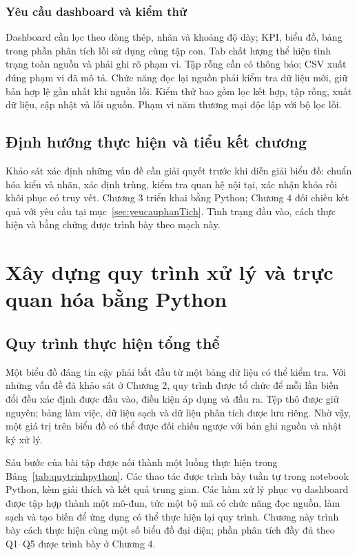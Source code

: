 \documentclass[12pt,a4paper,oneside]{report}
\begin{document}
\subsection{Yêu cầu dashboard và kiểm thử}

Dashboard cần lọc theo dòng thép, nhãn và khoảng độ dày; KPI, biểu đồ, bảng trong phần phân tích lỗi sử dụng cùng tập con. Tab chất lượng thể hiện tình trạng toàn nguồn và phải ghi rõ phạm vi. Tập rỗng cần có thông báo; CSV xuất đúng phạm vi đã mô tả. Chức năng đọc lại nguồn phải kiểm tra dữ liệu mới, giữ bản hợp lệ gần nhất khi nguồn lỗi. Kiểm thử bao gồm lọc kết hợp, tập rỗng, xuất dữ liệu, cập nhật và lỗi nguồn. Phạm vi năm thương mại độc lập với bộ lọc lỗi.

\section{Định hướng thực hiện và tiểu kết chương}

Khảo sát xác định những vấn đề cần giải quyết trước khi diễn giải biểu đồ: chuẩn hóa kiểu và nhãn, xác định trùng, kiểm tra quan hệ nội tại, xác nhận khóa rồi khôi phục có truy vết. Chương 3 triển khai bằng Python; Chương 4 đối chiếu kết quả với yêu cầu tại mục~\ref{sec:yeucauphanTich}. Tình trạng đầu vào, cách thực hiện và bằng chứng được trình bày theo mạch này.

\chapter{Xây dựng quy trình xử lý và trực quan hóa bằng Python}
\label{chap:thuchien}

\section{Quy trình thực hiện tổng thể}

Một biểu đồ đáng tin cậy phải bắt đầu từ một bảng dữ liệu có thể kiểm tra. Với những vấn đề đã khảo sát ở Chương 2, quy trình được tổ chức để mỗi lần biến đổi đều xác định được đầu vào, điều kiện áp dụng và đầu ra. Tệp thô được giữ nguyên; bảng làm việc, dữ liệu sạch và dữ liệu phân tích được lưu riêng. Nhờ vậy, một giá trị trên biểu đồ có thể được đối chiếu ngược với bản ghi nguồn và nhật ký xử lý.

Sáu bước của bài tập được nối thành một luồng thực hiện trong Bảng~\ref{tab:quytrinhpython}. Các thao tác được trình bày tuần tự trong notebook Python, kèm giải thích và kết quả trung gian. Các hàm xử lý phục vụ dashboard được tập hợp thành một mô-đun, tức một bộ mã có chức năng đọc nguồn, làm sạch và tạo biến để ứng dụng có thể thực hiện lại quy trình. Chương này trình bày cách thực hiện cùng một số biểu đồ đại diện; phần phân tích đầy đủ theo Q1--Q5 được trình bày ở Chương 4.
\end{document}
